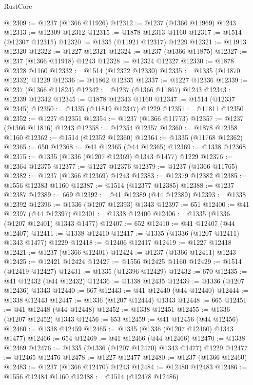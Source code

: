 \begin{lexlean}{RustCore}
\begin{coremodule}
@12309 := @1237 (@1366 @11926)
@12312 := @1237 (@1366 @11969) @1243
@12313 := @12309 @12312
@12315 := @1878 @12313 @1160
@12317 := @1514 (@12307 @12315)
@12320 := @1335 (@11921 @12317) @1229
@12321 := @11913 @12320
@12322 := @1227 @12321
@12324 := @1237 (@1366 @11875)
@12327 := @1237 (@1366 @11918) @1243
@12328 := @12324 @12327
@12330 := @1878 @12328 @1160
@12332 := @1514 (@12322 @12330)
@12335 := @1335 (@11870 @12332) @1229
@12336 := @11862 @12335
@12337 := @1227 @12336
@12339 := @1237 (@1366 @11824)
@12342 := @1237 (@1366 @11867) @1243
@12343 := @12339 @12342
@12345 := @1878 @12343 @1160
@12347 := @1514 (@12337 @12345)
@12350 := @1335 (@11819 @12347) @1229
@12351 := @11811 @12350
@12352 := @1227 @12351
@12354 := @1237 (@1366 @11773)
@12357 := @1237 (@1366 @11816) @1243
@12358 := @12354 @12357
@12360 := @1878 @12358 @1160
@12362 := @1514 (@12352 @12360)
@12364 := @1335 (@11768 @12362)
@12365 := 650
@12368 := @41 @12365 (@44 @12365)
@12369 := @1338 @12368
@12375 := @1335 (@1336 (@1207 @12369) @1343 @1477) @1229
@12376 := @12364 @12375
@12377 := @1227 @12376
@12379 := @1237 (@1366 @11765)
@12382 := @1237 (@1366 @12369) @1243
@12383 := @12379 @12382
@12385 := @1556 @12383 @1160
@12387 := @1514 (@12377 @12385)
@12388 := @1237 @12387
@12389 := 669
@12392 := @41 @12389 (@44 @12389)
@12393 := @1338 @12392
@12396 := @1336 (@1207 @12393) @1343
@12397 := 651
@12400 := @41 @12397 (@44 @12397)
@12401 := @1338 @12400
@12406 := @1335 (@1336 (@1207 @12401) @1343 @1477)
@12407 := 652
@12410 := @41 @12407 (@44 @12407)
@12411 := @1338 @12410
@12417 := @1335 (@1336 (@1207 @12411) @1343 @1477) @1229
@12418 := @12406 @12417
@12419 := @1227 @12418
@12421 := @1237 (@1366 @12401)
@12424 := @1237 (@1366 @12411) @1243
@12425 := @12421 @12424
@12427 := @1556 @12425 @1160
@12429 := @1514 (@12419 @12427)
@12431 := @1335 (@12396 @12429)
@12432 := 670
@12435 := @41 @12432 (@44 @12432)
@12436 := @1338 @12435
@12439 := @1336 (@1207 @12436) @1343
@12440 := 667
@12443 := @41 @12440 (@44 @12440)
@12444 := @1338 @12443
@12447 := @1336 (@1207 @12444) @1343
@12448 := 665
@12451 := @41 @12448 (@44 @12448)
@12452 := @1338 @12451
@12455 := @1336 (@1207 @12452) @1343
@12456 := 653
@12459 := @41 @12456 (@44 @12456)
@12460 := @1338 @12459
@12465 := @1335 (@1336 (@1207 @12460) @1343 @1477)
@12466 := 654
@12469 := @41 @12466 (@44 @12466)
@12470 := @1338 @12469
@12476 := @1335 (@1336 (@1207 @12470) @1343 @1477) @1229
@12477 := @12465 @12476
@12478 := @1227 @12477
@12480 := @1237 (@1366 @12460)
@12483 := @1237 (@1366 @12470) @1243
@12484 := @12480 @12483
@12486 := @1556 @12484 @1160
@12488 := @1514 (@12478 @12486)

\end{coremodule}
\end{lexlean}
